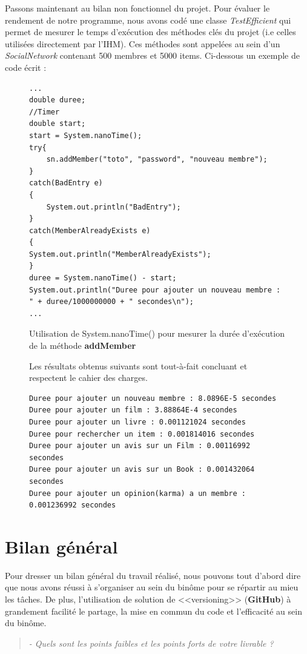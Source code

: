 \documentclass[12pt,a4paper]{report}
\begin{document}
Passons maintenant au bilan non fonctionnel du projet. Pour évaluer le rendement de notre programme,
nous avons codé une classe \emph{TestEfficient} qui permet de mesurer le temps d'exécution des méthodes clés du projet (i.e celles utilisées directement par l'IHM). Ces méthodes sont appelées au sein d'un \emph{SocialNetwork} contenant 500 membres et 5000 items. Ci-dessous un exemple de code écrit :

\begin{figure}[h]
\begin{lstlisting}[caption = Code de rendement d'une fonction]
...
double duree;
//Timer
double start;
start = System.nanoTime();
try{
	sn.addMember("toto", "password", "nouveau membre");
}
catch(BadEntry e)
{
	System.out.println("BadEntry");
}
catch(MemberAlreadyExists e)
{
System.out.println("MemberAlreadyExists");
}
duree = System.nanoTime() - start;
System.out.println("Duree pour ajouter un nouveau membre : " + duree/1000000000 + " secondes\n");
...
\end{lstlisting} 
\begin{center}
{\small Utilisation de System.nanoTime() pour mesurer la durée d'exécution de la méthode \textbf{addMember}}
\end{center}
\end{figure}

\begin{figure}[h]
Les résultats obtenus suivants sont tout-à-fait concluant et respectent le cahier des charges.
\begin{lstlisting}[caption = Resultats obtenus]
Duree pour ajouter un nouveau membre : 8.0896E-5 secondes
Duree pour ajouter un film : 3.88864E-4 secondes
Duree pour ajouter un livre : 0.001121024 secondes
Duree pour rechercher un item : 0.001814016 secondes
Duree pour ajouter un avis sur un Film : 0.00116992 secondes
Duree pour ajouter un avis sur un Book : 0.001432064 secondes
Duree pour ajouter un opinion(karma) a un membre : 0.001236992 secondes
\end{lstlisting}
\end{figure}

\chapter*{Bilan général}
\label{chapter:Bilan général} %
Pour dresser un bilan général du travail réalisé, nous pouvons tout d'abord dire que nous avons réussi à s'organiser au sein du binôme pour se répartir au mieu les tâches. De plus, l'utilisation de solution de <<versioning>> (\textbf{GitHub}) à grandement facilité le partage, la mise en commun du code et l'efficacité au sein du binôme.
\begin{quotation}
\textit{- Quels sont les points faibles et les points forts de votre livrable ?}
\end{quotation}
\end{document}
